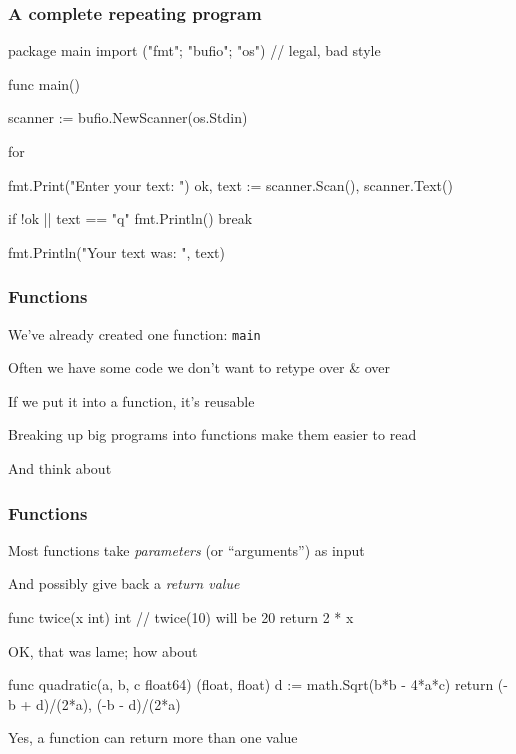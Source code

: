 \documentclass[handout,compress,t,11pt]{beamer}
\begin{document}
\begin{frame}[fragile]
    \frametitle{A complete repeating program}
\begin{golang}
package main
import ("fmt"; "bufio"; "os")   // legal, bad style

func main() {
    scanner := bufio.NewScanner(os.Stdin)

    for {
        fmt.Print("Enter your text: ")
        ok, text := scanner.Scan(), scanner.Text()

        if !ok || text == "q" {
            fmt.Println()
            break
        }

        fmt.Println("Your text was: ", text)
    }
}
\end{golang}
\end{frame}

\begin{frame}[fragile]
    \frametitle{Functions}
    We've already created one function: \verb|main| \par
    \vspace{2\baselineskip}
    Often we have some code we don't want to retype over \& over \par
    \vspace{0.5\baselineskip}
    If we put it into a function, it's reusable \par
    \vspace{2\baselineskip}
    Breaking up big programs into functions make them easier to read \par
    \vspace{0.5\baselineskip}
    And think about
\end{frame}

\begin{frame}[fragile]
    \frametitle{Functions}
    Most functions take {\em parameters} (or ``arguments'') as input \par
    \vspace{0.5\baselineskip}
    And possibly give back a {\em return value}
\begin{golang}
func twice(x int) int {    // twice(10) will be 20
    return 2 * x
}
\end{golang}
    \vspace{0.8\baselineskip}
OK, that was lame; how about
\begin{golang}
func quadratic(a, b, c float64) (float, float) {
    d := math.Sqrt(b*b - 4*a*c)
    return (-b + d)/(2*a), (-b - d)/(2*a)
}
\end{golang}
    \vspace{0.6\baselineskip}
Yes, a function can return more than one value
\end{frame}
\end{document}
